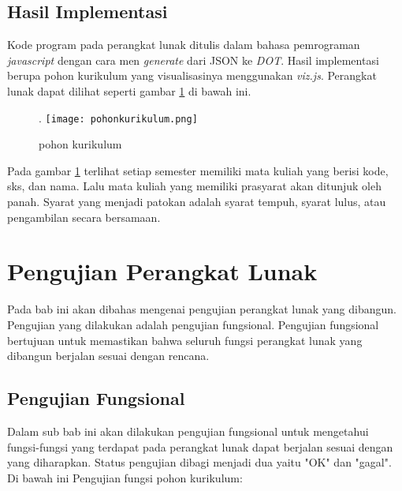 \subsection{Hasil Implementasi}
\label{sec: Hasil Implementasi}

Kode program pada perangkat lunak ditulis dalam bahasa pemrograman \textit{javascript} dengan cara men \textit{generate} dari JSON ke \textit{DOT}. Hasil implementasi berupa pohon kurikulum yang visualisasinya menggunakan \textit{viz.js}. Perangkat lunak dapat dilihat seperti gambar \ref{fig: pohon kurikulum} di bawah ini.

\begin{figure}[H]
		\left.
		\texttt{[image: pohonkurikulum.png]}
		\caption{pohon kurikulum}
		\label{fig: pohon kurikulum}
\end{figure}	 

Pada gambar \ref{fig: pohon kurikulum} terlihat setiap semester memiliki mata kuliah yang berisi kode, sks, dan nama. Lalu mata kuliah yang memiliki prasyarat akan ditunjuk oleh panah. Syarat yang menjadi patokan adalah syarat tempuh, syarat lulus, atau pengambilan secara bersamaan.
\section{Pengujian Perangkat Lunak}
\label{sec: Pengujian Perangkat Lunak}

Pada bab ini akan dibahas mengenai pengujian perangkat lunak yang dibangun. Pengujian yang dilakukan adalah pengujian fungsional. Pengujian fungsional bertujuan untuk memastikan bahwa seluruh fungsi perangkat
lunak yang dibangun berjalan sesuai dengan rencana.

\subsection{Pengujian Fungsional}
\label{sec: Pengujian Fungsional}
Dalam sub bab ini akan dilakukan pengujian fungsional untuk mengetahui fungsi-fungsi yang terdapat
pada perangkat lunak dapat berjalan sesuai dengan yang diharapkan. Status pengujian dibagi
menjadi dua yaitu "OK" dan "gagal". Di bawah ini Pengujian fungsi pohon kurikulum:

